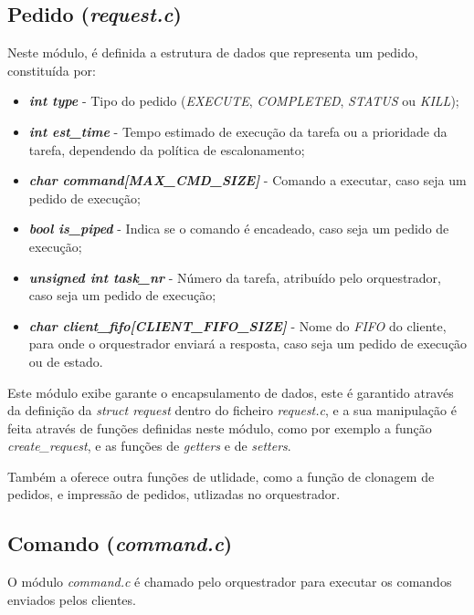 \documentclass[a4paper,11pt]{scrreprt}
\begin{document}
        \subsection{Pedido (\textit{request.c})}
            Neste módulo, é definida a estrutura de dados que representa um pedido, constituída por:
            \begin{itemize}
                \item \textbf{\textit{int type}} - Tipo do pedido
                    (\textit{EXECUTE}, \textit{COMPLETED}, \textit{STATUS} ou \textit{KILL});
                \item \textbf{\textit{int est\_time}} - Tempo estimado de execução da tarefa
                    ou a prioridade da tarefa, dependendo da política de escalonamento;
                \item \textbf{\textit{char command[MAX\_CMD\_SIZE]}} - Comando a executar, caso seja um pedido de execução;
                \item \textbf{\textit{bool is\_piped}} - Indica se o comando é encadeado, caso seja um pedido de execução;
                \item \textbf{\textit{unsigned int task\_nr}} - Número da tarefa, atribuído pelo orquestrador, caso seja um pedido de execução;
                \item \textbf{\textit{char client\_fifo[CLIENT\_FIFO\_SIZE]}} - Nome do \textit{FIFO} do cliente,
                    para onde o orquestrador enviará a resposta, caso seja um pedido de execução ou de estado.
            \end{itemize}

            Este módulo exibe garante o encapsulamento de dados, este é garantido através da definição da
            \textit{struct request} dentro do ficheiro \textit{request.c}, e a sua manipulação é feita através
            de funções definidas neste módulo, como por exemplo a função \textit{create\_request}, e as funções
            de \textit{getters} e de \textit{setters}.

            Também a oferece outra funções de utlidade, como a função de clonagem de pedidos, e impressão de pedidos,
            utlizadas no orquestrador.

        \subsection{Comando (\textit{command.c})}
            O módulo \textit{command.c} é chamado pelo orquestrador para executar os comandos enviados pelos clientes.
\end{document}
